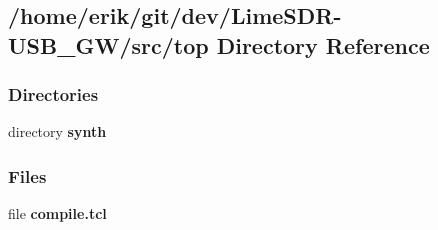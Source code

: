 \subsection{/home/erik/git/dev/\+Lime\+S\+D\+R-\/\+U\+S\+B\+\_\+\+G\+W/src/top Directory Reference}
\label{dir_059d49894f33968775d9ac22a6da9c17}
\subsubsection*{Directories}
\begin{DoxyCompactItemize}
\item 
directory {\bf synth}
\end{DoxyCompactItemize}
\subsubsection*{Files}
\begin{DoxyCompactItemize}
\item 
file {\bf compile.\+tcl}
\end{DoxyCompactItemize}
